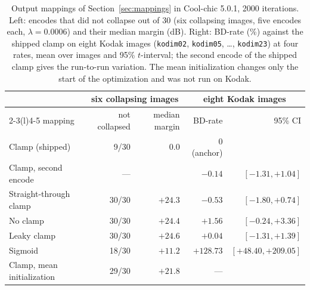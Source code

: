 \begin{table}[t]
\centering
\caption{\label{tab:remedies}%
Output mappings of Section~\ref{sec:mappings} in Cool-chic 5.0.1, 2000 iterations. Left:
encodes that did not collapse out of 30 (six collapsing images, five encodes each,
$\lambda = 0.0006$) and their median margin (dB). Right: BD-rate (\%) against the shipped
clamp on eight Kodak images (\texttt{kodim02}, \texttt{kodim05}, \ldots, \texttt{kodim23})
at four rates, mean over images and 95\% $t$-interval; the second encode of the shipped clamp
gives the run-to-run variation. The mean initialization changes only the start of the
optimization and was not run on Kodak.}
\small
\begin{tabular}{lrrrr}
\toprule
 & \multicolumn{2}{c}{six collapsing images} & \multicolumn{2}{c}{eight Kodak images} \\
\cmidrule(lr){2-3}\cmidrule(l){4-5}
mapping & not collapsed & median margin & BD-rate & 95\% CI \\
\midrule
Clamp (shipped) & 9/30 & $0.0$ & 0 (anchor) &  \\
Clamp, second encode & --- &  & $-0.14$ & $[-1.31, +1.04]$ \\
Straight-through clamp & 30/30 & $+24.3$ & $-0.53$ & $[-1.80, +0.74]$ \\
No clamp & 30/30 & $+24.4$ & $+1.56$ & $[-0.24, +3.36]$ \\
Leaky clamp & 30/30 & $+24.6$ & $+0.04$ & $[-1.31, +1.39]$ \\
Sigmoid & 18/30 & $+11.2$ & $+128.73$ & $[+48.40, +209.05]$ \\
Clamp, mean initialization & 29/30 & $+21.8$ & --- &  \\
\bottomrule
\end{tabular}
\end{table}
